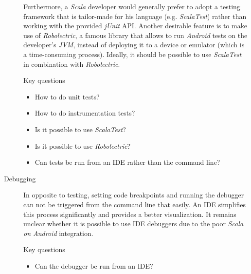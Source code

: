 \begin{description}
	Furthermore, a \textit{Scala} developer would generally prefer to adopt a testing framework that is tailor-made for his language (e.g. \textit{ScalaTest}) rather than working with the provided \textit{jUnit} \ac{API}. Another desirable feature is to make use of \textit{Robolectric}, a famous library that allows to run \textit{Android} tests on the developer's \textit{JVM}, instead of deploying it to a device or emulator (which is a time-consuming process). Ideally, it should be possible to use \textit{ScalaTest} in combination with \textit{Robolectric}.

	\begin{highlight}{Key questions}

		\begin{itemize}

			\item How to do unit tests?

			\item How to do instrumentation tests?

			\item Is it possible to use \textit{ScalaTest}?

			\item Is it possible to use \textit{Robolectric}?

			\item Can tests be run from an \ac{IDE} rather than the command line?

		\end{itemize}

	\end{highlight}

	\item[Debugging]\hfill

	In opposite to testing, setting code breakpoints and running the debugger can not be triggered from the command line that easily. An \ac{IDE} simplifies this process significantly and provides a better visualization. It remains unclear whether it is possible to use \ac{IDE} debuggers due to the poor \textit{Scala on Android} integration.

	\begin{highlight}{Key questions}

		\begin{itemize}

			\item Can the debugger be run from an \ac{IDE}?

		\end{itemize}

	\end{highlight}


\end{description}
